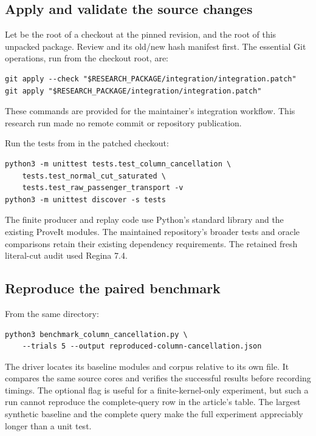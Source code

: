 \subsection{Apply and validate the source changes}

Let  be the root of a checkout at the pinned
revision, and  the root of this unpacked package.
Review  and its old/new hash manifest first.
The essential Git operations, run from the checkout root, are:
\begin{lstlisting}
git apply --check "$RESEARCH_PACKAGE/integration/integration.patch"
git apply "$RESEARCH_PACKAGE/integration/integration.patch"
\end{lstlisting}
These commands are provided for the maintainer's integration workflow.
This research run made no remote commit or repository publication.

Run the tests from
 in the patched checkout:
\begin{lstlisting}
python3 -m unittest tests.test_column_cancellation \
    tests.test_normal_cut_saturated \
    tests.test_raw_passenger_transport -v
python3 -m unittest discover -s tests
\end{lstlisting}
The finite producer and replay code use Python's standard library and
the existing ProveIt modules. The maintained repository's broader tests
and oracle comparisons retain their existing dependency requirements.
The retained fresh literal-cut audit used Regina 7.4.

\subsection{Reproduce the paired benchmark}

From the same  directory:
\begin{lstlisting}
python3 benchmark_column_cancellation.py \
    --trials 5 --output reproduced-column-cancellation.json
\end{lstlisting}
The driver locates its baseline modules and corpus relative to its own
file. It compares the same source cores and verifies the successful
results before recording timings. The optional
\code{--skip-whole-cuts} flag is useful for a finite-kernel-only
experiment, but such a run cannot reproduce the complete-query row in
the article's table. The largest synthetic baseline and the complete
query make the full experiment appreciably longer than a unit test.

